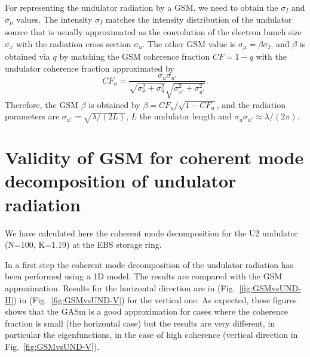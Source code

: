 \documentclass{iucr}              %
\begin{document}
For representing the undulator radiation by a GSM, we need to obtain the $\sigma_I$ and $\sigma_\mu$ values. The intensity $\sigma_I$ matches the intensity distribution of the undulator source that is usually approximated as the convolution of the electron bunch size $\sigma_x$ with the radiation cross section $\sigma_u$. The other GSM value is $\sigma_\mu=\beta\sigma_I$, and $\beta$ is obtained via $q$ by matching the GSM coherence fraction $CF=1-q$ with the undulator coherence fraction approximated by
\begin{equation}
    CF_u = \frac{\sigma_u\sigma_{u'}}{\sqrt{\sigma_x^2+\sigma_u^2}\sqrt{\sigma_{x'}^2+\sigma_{u'}^2}}.
\end{equation}
Therefore, the GSM $\beta$ is obtained by $\beta=CF_u/\sqrt{1-CF_u}$,
and the radiation parameters are $\sigma_{u'}=\sqrt{\lambda/(2L)}$, $L$ the undulator length and $\sigma_u \sigma_{u'} \approx \lambda / (2 \pi)$.


\section{Validity of GSM for coherent mode decomposition of undulator radiation}
\label{appendix:validity}

We have calculated here the coherent mode decomposition for the U2 undulator (N=100, K=1.19) at the EBS storage ring. 

In a first step the coherent mode decomposition of the undulator radiation has been performed using a 1D model. The results are compared with the GSM approximation. Results for the horizontal direction are in (Fig.~\ref{fig:GSMvsUND-H}) in (Fig.~\ref{fig:GSMvsUND-V}) for the vertical one. As expected, these figures shows that the GASm is a good approximation for cases where the coherence fraction is small (the horizontal case) but the results are very different, in particular the eigenfunctions, in the case of high coherence (vertical direction in Fig.~\ref{fig:GSMvsUND-V}).
\end{document}
